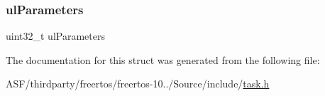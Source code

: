 \mbox{\label{structx_m_e_m_o_r_y___r_e_g_i_o_n_a8339f23aad15c6b829547a17f839f32c}} 
\subsubsection{\texorpdfstring{ulParameters}{ulParameters}}
{\footnotesize\ttfamily uint32\+\_\+t ul\+Parameters}



The documentation for this struct was generated from the following file\+:\begin{DoxyCompactItemize}
\item 
A\+S\+F/thirdparty/freertos/freertos-\/10../\+Source/include/\mbox{\hyperlink{task_8h}{task.\+h}}\end{DoxyCompactItemize}
